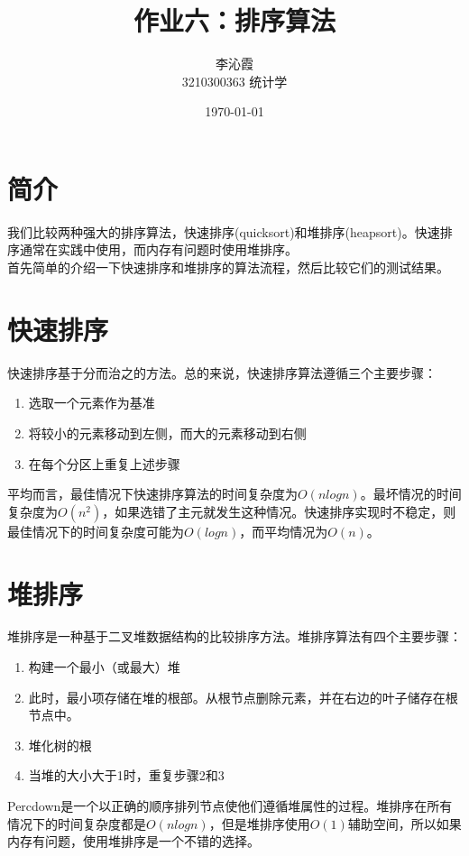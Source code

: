 \documentclass[a4paper]{article}
\title{\textbf{作业六：排序算法}}
\author{李沁霞 \\ 3210300363 统计学}
\date{\today}
\begin{document}
\maketitle

\section{简介}
我们比较两种强大的排序算法，快速排序(quicksort)和堆排序(heapsort)。快速排序通常在实践中使用，而内存有问题时使用堆排序。
\\
首先简单的介绍一下快速排序和堆排序的算法流程，然后比较它们的测试结果。

\section{快速排序}
快速排序基于分而治之的方法。总的来说，快速排序算法遵循三个主要步骤：
\begin{enumerate}
    \item 选取一个元素作为基准
    \item 将较小的元素移动到左侧，而大的元素移动到右侧
    \item 在每个分区上重复上述步骤
\end{enumerate}
平均而言，最佳情况下快速排序算法的时间复杂度为$O(nlogn)$。最坏情况的时间复杂度为$O(n^2)$，如果选错了主元就发生这种情况。快速排序实现时不稳定，则最佳情况下的时间复杂度可能为$O(logn)$，而平均情况为$O(n)$。

\section{堆排序}
堆排序是一种基于二叉堆数据结构的比较排序方法。堆排序算法有四个主要步骤：
\begin{enumerate}
    \item 构建一个最小（或最大）堆
    \item 此时，最小项存储在堆的根部。从根节点删除元素，并在右边的叶子储存在根节点中。
    \item 堆化树的根
    \item 当堆的大小大于1时，重复步骤2和3
\end{enumerate}
Percdown是一个以正确的顺序排列节点使他们遵循堆属性的过程。堆排序在所有情况下的时间复杂度都是$O(nlogn)$，但是堆排序使用$O(1)$辅助空间，所以如果内存有问题，使用堆排序是一个不错的选择。
\end{document}
